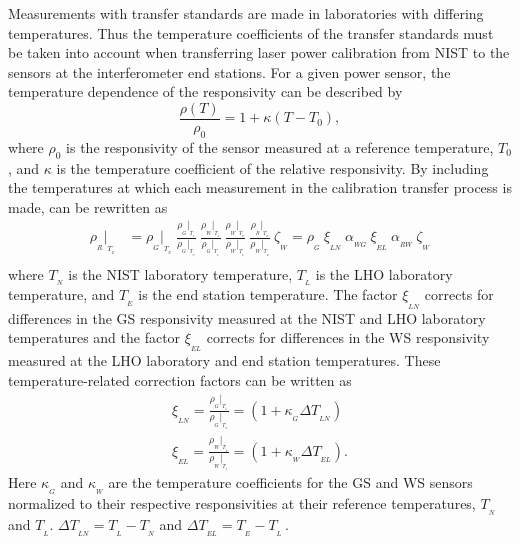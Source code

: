 \documentclass[12pt,a4paper,final]{iopart}
\begin{document}
Measurements with transfer standards are made in laboratories with differing temperatures.  Thus the temperature coefficients of the transfer standards must be taken into account when transferring laser power calibration from NIST to the sensors at the interferometer end stations. 
For a given power sensor, the temperature dependence of the responsivity can be described by 
%
\begin{equation}
\frac{\rho(T) } {\rho_0} =  1 + \kappa (T - T_0),
\end{equation}
%
where $\rho_0$ is the responsivity of the sensor measured at a reference temperature, $T_0$, and  $\kappa$ is the temperature coefficient of the relative responsivity.  By including the temperatures at which each measurement in the calibration transfer process is made,  can be rewritten as
%
\begin{equation}
\begin{aligned}
\label{eq:rho_TR_temp}
    \rho_{_{R}}|_{_{{T}_{_E}}} & = \rho_{_{G}}|_{_{T_{_N}}} \ \frac{\rho_{_G}|_{_{T_{_L}}}}{\rho_{_G}|_{_{T_{_N}}}} \ \frac{\rho_{_W}|_{_{T_{_L}}}}{\rho_{_G}|_{_{T_{_L}}}} \ \frac{\rho_{_W}|_{_{T_{_E}}}}{\rho_{_W}|_{_{T_{_L}}}} \  \frac{\rho_{_R}|_{_{T_{_E}}}}{\rho_{_W}|_{_{T_{_E}}}} \  \zeta_{_{W}} =
    \rho_{_{G}} \ \xi_{_{LN}} \ \alpha_{_{WG}} \ 
    \xi_{_{EL}} \ \alpha_{_{RW}} \ \zeta_{_{W}} \\ 
\end{aligned}
\end{equation}
%
where $T_{_{N}}$ is the NIST laboratory temperature, $T_{_{L}}$ is the  LHO laboratory temperature, and $T_{_{E}}$ is the end station temperature.  The factor $\xi_{_{LN}}$ corrects for differences in the GS responsivity measured at the NIST and LHO laboratory temperatures and the factor $\xi_{_{EL}}$ corrects for differences in the WS responsivity measured at the LHO laboratory and end station temperatures. These temperature-related correction factors can be written as
%
\begin{equation}
\begin{aligned}
\label{eq:xi}
    \xi_{_{LN}} = \frac{\rho_{_G}|_{_{T_{_L}}}}{\rho_{_G}|_{_{T_{_N}}}} = (1 + \kappa_{_{G}}\Delta T_{_{LN}}) \\
    \xi_{_{EL}} = \frac{\rho_{_W}|_{_{T_{_E}}}}{\rho_{_W}|_{_{T_{_L}}}} = (1 + \kappa_{_{W}}\Delta T_{_{EL}}) .
\end{aligned}
\end{equation}    
%
Here $\kappa_{_{G}}$ and  $\kappa_{_{W}}$ are the temperature coefficients for the GS and WS sensors normalized to their respective responsivities at their reference temperatures, $T_{_{N}}$ and $T_{_{L}}$.  $\Delta T_{_{LN}} = T_{_{L}} - T_{_{N}}$ and $\Delta T_{_{EL}} = T_{_{E}} - T_{_{L}}$\,.
\end{document}
